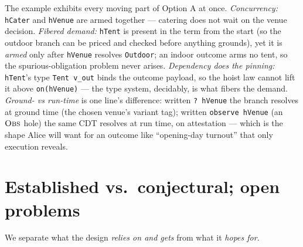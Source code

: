 \documentclass[11pt]{article}
\newcommand{\rul}[1]{\ensuremath{\textsc{#1}}}
\newcommand{\code}[1]{\lstinline[language=rho,basicstyle=\ttfamily\small]|#1|}
\begin{document}
\noindent
The example exhibits every moving part of Option A at once. \emph{Concurrency:} \code{hCater} and
\code{hVenue} are armed together --- catering does not wait on the venue decision. \emph{Fibered
demand:} \code{hTent} is present in the term from the start (so the outdoor branch can be priced and
checked before anything grounds), yet it is \emph{armed} only after \code{hVenue} resolves
\code{Outdoor}; an indoor outcome arms no tent, so the spurious-obligation problem never arises.
\emph{Dependency does the pinning:} \code{hTent}'s type \code{Tent v_out} binds the outcome payload, so
the hoist law cannot lift it above \code{on(hVenue)} --- the type system, decidably, is what fibers the
demand. \emph{Ground- vs run-time} is one line's difference: written \code{? hVenue} the branch
resolves at ground time (the chosen venue's variant tag); written \code{observe hVenue} (an \rul{Obs}
hole) the same CDT resolves at run time, on attestation --- which is the shape Alice will want for an
outcome like ``opening-day turnout'' that only execution reveals.

\section{Established vs.\ conjectural; open problems}\label{sec:open}
We separate what the design \emph{relies on and gets} from what it \emph{hopes for}.
\end{document}
